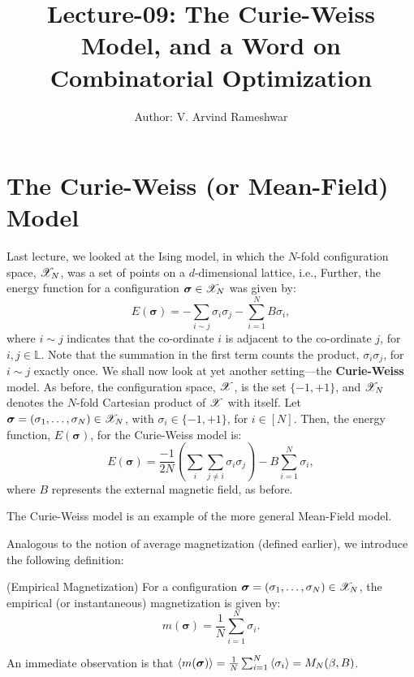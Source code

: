 \documentclass[letterpaper,english,10pt]{article}
\title{Lecture-09: The Curie-Weiss Model, and a Word on Combinatorial Optimization}
\author{Author: V. Arvind Rameshwar}
\begin{document}
\maketitle
\section{The Curie-Weiss (or Mean-Field) Model}

Last lecture, we looked at the Ising model, in which the $N$-fold configuration space, $\mathscr{X}_{N}$, was a set of points on a $d$-dimensional lattice, i.e., 
Further, the energy function for a configuration $\bm{\sigma}\in \mathscr{X}_{N}$ was given by:
\begin{equation*}
    E(\bm{\sigma}) = -\sum_{i\sim j}\sigma_{i}\sigma_j - \sum_{i=1}^{N}B\sigma_i,
\end{equation*}
where $i\sim j$ indicates that the co-ordinate $i$ is adjacent to the co-ordinate $j$, for $i,j\in \mathbb{L}$. Note that the summation in the first term counts the product, $\sigma_i\sigma_j$, for $i\sim j$ exactly once.
We shall now look at yet another setting---the \textbf{Curie-Weiss} model.
As before, the configuration space, $\mathscr{X}$, is the set $\{-1,+1\}$, and $\mathscr{X}_{N}$ denotes the $N$-fold Cartesian product of $\mathscr{X}$ with itself. Let $\bm{\sigma} = (\sigma_1,\ldots,\sigma_N)\in \mathscr{X}_{N}$, with $\sigma_i \in \{-1,+1\}$, for $i\in [N]$. Then, the energy function, $E(\bm{\sigma})$, for the Curie-Weiss model is:
\begin{equation}\label{energyeq}
E(\bm{\sigma}) = \frac{-1}{2N}\left(\sum_{i}\sum_{j\neq i}\sigma_i\sigma_j\right) - B\sum_{i=1}^{N}\sigma_i,
\end{equation}
where $B$ represents the external magnetic field, as before.
\begin{rem}
The Curie-Weiss model is an example of the more general Mean-Field model.
\end{rem}
Analogous to the notion of average magnetization (defined earlier), we introduce the following definition:
\begin{defn}(Empirical Magnetization)
For a configuration $\bm{\sigma}=(\sigma_1,\ldots,\sigma_N)\in \mathscr{X}_{N}$, the empirical (or instantaneous) magnetization is given by:
\begin{equation*}
    m(\bm{\sigma}) = \frac{1}{N}\sum_{i=1}^{N}\sigma_i.
\end{equation*}
\end{defn}
An immediate observation is that $\left\langle m(\bm{\sigma})\right\rangle = \frac{1}{N}\sum_{i=1}^{N}\left\langle\sigma_i\right\rangle = M_{N}(\beta,B)$.
\end{document}
